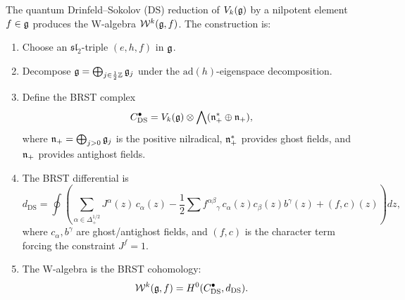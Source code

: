 \begin{setup}
The quantum Drinfeld--Sokolov (DS) reduction of $V_k(\mathfrak{g})$ by a
nilpotent element $f \in \mathfrak{g}$ produces the W-algebra $\mathcal{W}^k(\mathfrak{g}, f)$.
The construction is:
\begin{enumerate}
\item Choose an $\mathfrak{sl}_2$-triple $(e, h, f)$ in $\mathfrak{g}$.
\item Decompose $\mathfrak{g} = \bigoplus_{j \in \frac{1}{2}\mathbb{Z}} \mathfrak{g}_j$ under
 the $\mathrm{ad}(h)$-eigenspace decomposition.
\item Define the BRST complex
 \[
 C^\bullet_{\mathrm{DS}}
 = V_k(\mathfrak{g}) \otimes \bigwedge(\mathfrak{n}_+^* \oplus \mathfrak{n}_+),
 \]
 where $\mathfrak{n}_+ = \bigoplus_{j > 0} \mathfrak{g}_j$ is the positive nilradical,
 $\mathfrak{n}_+^*$ provides ghost fields, and $\mathfrak{n}_+$ provides antighost fields.
\item The BRST differential is
 \[
 d_{\mathrm{DS}} = \oint \left(
 \sum_{\alpha \in \Delta_+^{1/2}} J^\alpha(z) \, c_\alpha(z)
 - \frac{1}{2} \sum f^{\alpha\beta}{}_\gamma \,
 c_\alpha(z) c_\beta(z) b^\gamma(z)
 + (f, c)(z)
 \right) dz,
 \]
 where $c_\alpha, b^\gamma$ are ghost/antighost fields, and $(f, c)$
 is the character term forcing the constraint $J^f = 1$.
\item The W-algebra is the BRST cohomology:
 \[
 \mathcal{W}^k(\mathfrak{g}, f) = H^0(C^\bullet_{\mathrm{DS}}, d_{\mathrm{DS}}).
 \]
\end{enumerate}
\end{setup}

